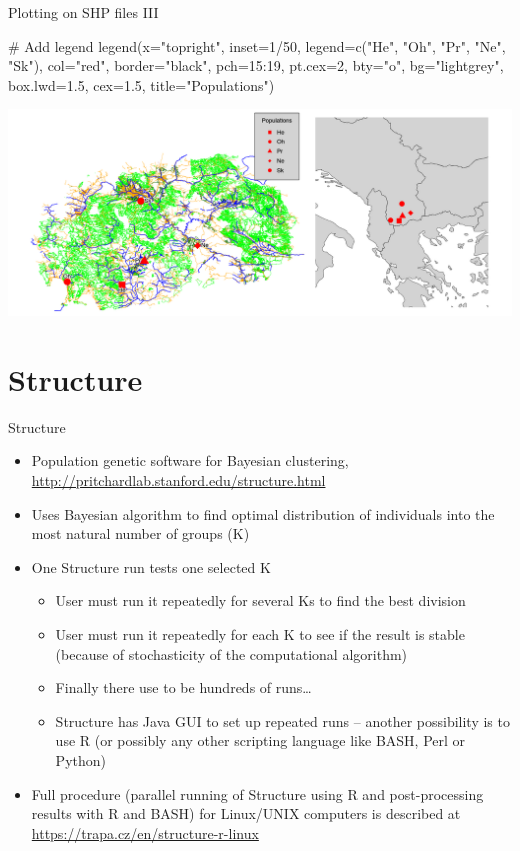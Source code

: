 \documentclass[compress, ucs, xelatex, 11pt, xcolor=svgnames,
  hyperref={
    bookmarks=true,
    unicode=true,
    colorlinks=true,
    pdftitle={Molecular data in R},
    plainpages=false,
    pdfauthor={Vojtech Zeisek},
    pdfsubject={Course about phylogeny and evolution in R},
    pdfcreator={XeLaTeX},
    pdfkeywords={R, evolution, phylogeny, molecular data},
    linkcolor=Tomato,
    anchorcolor=SaddleBrown,
    citecolor=Goldenrod,
    filecolor=DarkMagenta,
    menucolor=Sienna,
    urlcolor=DarkTurquoise,
    pdftex},
  url={hyphens, lowtilde} %
  ]{beamer}
\begin{document}
\begin{frame}[fragile]{Plotting on SHP files III}
  \vfil
  \begin{spluscode}
    # Add legend
    legend(x="topright", inset=1/50, legend=c("He", "Oh", "Pr", "Ne",
      "Sk"), col="red", border="black", pch=15:19, pt.cex=2, bty="o",
      bg="lightgrey", box.lwd=1.5, cex=1.5, title="Populations")
  \end{spluscode}
  \vfill
  \includegraphics[width=\textwidth]{mapy.png}
  \vfil
\end{frame}

\section{Structure}

\begin{frame}{Structure}
  \label{structure}
  \begin{itemize}
    \item Population genetic software for Bayesian clustering, \url{http://pritchardlab.stanford.edu/structure.html}
    \item Uses Bayesian algorithm to find optimal distribution of individuals into the most natural number of groups (K)
    \item One Structure run tests one selected K
    \begin{itemize}
      \item User must run it repeatedly for several Ks to find the best division
      \item User must run it repeatedly for each K to see if the result is stable (because of stochasticity of the computational algorithm)
      \item Finally there use to be hundreds of runs\ldots
      \item Structure has Java GUI to set up repeated runs -- another possibility is to use R (or possibly any other scripting language like BASH, Perl or Python)
    \end{itemize}
    \item Full procedure (parallel running of Structure using R and post-processing results with R and BASH) for Linux/UNIX computers is described at \url{https://trapa.cz/en/structure-r-linux}
  \end{itemize}
\end{frame}
\end{document}
